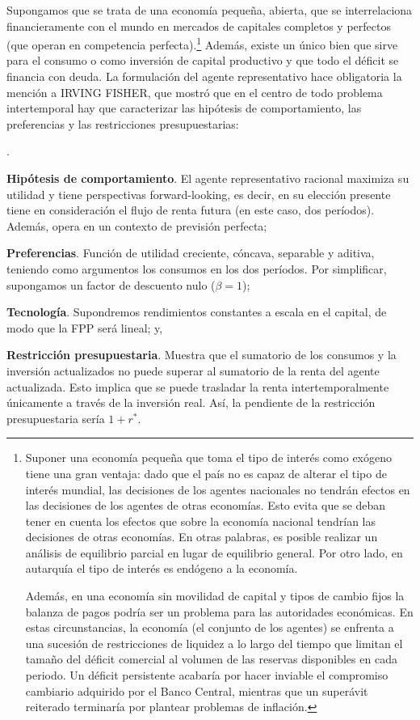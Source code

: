 \documentclass[10pt,a4paper]{article}
\newcounter{numitem}
\newenvironment{lnum}
      {\begin{list}{\arabic{numitem}.}{%
          \usecounter{numitem}%
          \setlength{\leftmargin}{1cm}%
          \setlength{\parskip}{3pt}%
          \setlength{\itemsep}{0pt}%
          \setlength{\parsep}{0pt}%
      }}
      {\end{list}}
\begin{document}
Supongamos que se trata de una economía pequeña, abierta, que se interrelaciona financieramente con el mundo en mercados de capitales completos y perfectos (que operan en competencia perfecta).\footnote{%
    Suponer una economía pequeña que toma el tipo de interés como exógeno tiene una gran ventaja: dado que el país no es capaz de alterar el tipo de interés mundial, las decisiones de los agentes nacionales no tendrán efectos en las decisiones de los agentes de otras economías. Esto evita que se deban tener en cuenta los efectos que sobre la economía nacional tendrían las decisiones de otras economías. En otras palabras, es posible realizar un análisis de equilibrio parcial en lugar de equilibrio general. Por otro lado, en autarquía el tipo de interés es endógeno a la economía.

Además, en una economía sin movilidad de capital y tipos de cambio fijos la balanza de pagos podría ser un problema para las autoridades económicas. En estas circunstancias, la economía (el conjunto de los agentes) se enfrenta a una sucesión de restricciones de liquidez a lo largo del tiempo que limitan el tamaño del déficit comercial al volumen de las reservas disponibles en cada periodo. Un déficit persistente acabaría por hacer inviable el compromiso cambiario adquirido por el Banco Central, mientras que un superávit reiterado terminaría por plantear problemas de inflación.
} Además, existe un único bien que sirve para el consumo o como inversión de capital productivo y que todo el déficit se financia con deuda. La formulación del agente representativo hace obligatoria la mención a IRVING FISHER, que mostró que en el centro de todo problema intertemporal hay que caracterizar las hipótesis de comportamiento, las preferencias y las restricciones presupuestarias:
\begin{lnum}
    \item \textbf{Hipótesis de comportamiento}. El agente representativo racional maximiza su utilidad y tiene perspectivas forward-looking, es decir, en su elección presente tiene en consideración el flujo de renta futura (en este caso, dos períodos). Además, opera en un contexto de previsión perfecta;
    \item \textbf{Preferencias}. Función de utilidad creciente, cóncava, separable y aditiva, teniendo como argumentos los consumos en los dos períodos. Por simplificar, supongamos un factor de descuento nulo ($\beta=1$);
    \item \textbf{Tecnología}. Supondremos rendimientos constantes a escala en el capital, de modo que la FPP será lineal; y,
    \item \textbf{Restricción presupuestaria}. Muestra que el sumatorio de los consumos y la inversión actualizados no puede superar al sumatorio de la renta del agente actualizada. Esto implica que se puede trasladar la renta intertemporalmente únicamente a través de la inversión real. Así, la pendiente de la restricción presupuestaria sería $1+r^*$.
\end{lnum}
\end{document}
